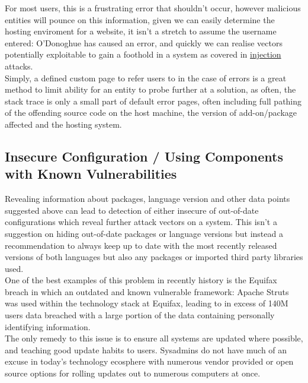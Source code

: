 \documentclass{IEEEtran}
\begin{document}
            For most users, this is a frustrating error that shouldn't occur, however malicious 
            entities will pounce on this information, given we can easily determine the hosting
            enviroment for a website, it isn't a stretch to assume the username entered: O'Donoghue
            has caused an error, and quickly we can realise vectors potentially exploitable to gain
            a foothold in a system as covered in \hyperref[sec:injection]{\color{blue}injection} attacks.
            \medskip
            \\
            Simply, a defined custom page to refer users to in the case of errors is a great method
            to limit ability for an entity to probe further at a solution, as often, the stack trace
            is only a small part of default error pages, often including full pathing of the 
            offending source code on the host machine, the version of add-on/package affected and 
            the hosting system.

        \subsection{Insecure Configuration / Using Components with Known Vulnerabilities}
            Revealing information about packages, language version and other data points suggested above can lead 
            to detection of either insecure of out-of-date configurations 
            which reveal further attack vectors on a system. This isn't a suggestion on hiding 
            out-of-date packages or language versions but instead a recommendation to always keep
            up to date with the most recently released versions of both languages but also any 
            packages or imported third party libraries used.
            \medskip
            \\
            One of the best examples of this problem in recently history is the Equifax breach in which an 
            outdated and known vulnerable framework: Apache Struts was used within the technology stack at
            Equifax\cite{Equifax-Breach}, leading to in excess of 140M users data breached with a large portion 
            of the data containing personally identifying information.
            \\
            The only remedy to this issue is to ensure all systems are updated where possible, and teaching good 
            update habits to users. Sysadmins do not have much of an excuse in today's technology ecosphere with 
            numerous vendor provided or open source options for rolling updates out to numerous computers at once.
\end{document}
